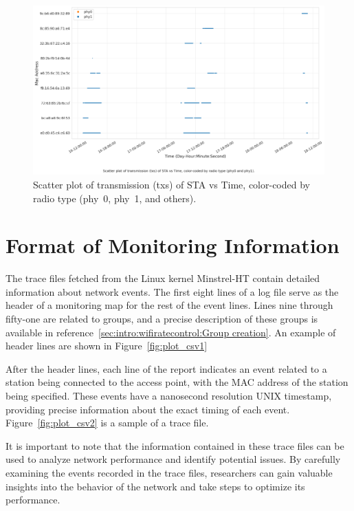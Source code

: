 \begin{landscape}

\begin{figure}[htbp]
  \centering
    \includegraphics[width=\textwidth, height=\textheight, keepaspectratio]{figures/plots/22.png}
  \caption[Stations' Transmission Over Time]{Scatter plot of transmission (txs) of STA vs Time, color-coded by radio type (phy~0, phy~1, and others).}
  \label{fig:plot_22_population}
\end{figure}
\end{landscape}

\section{Format of Monitoring Information}
\label{sec:Measurement Tools:Format of Monitoring Information}

The trace files fetched from the Linux kernel Minstrel-HT contain detailed information about network events. The first eight lines of a log file serve as the header of a monitoring map for the rest of the event lines. Lines nine through fifty-one are related to groups, and a precise description of these groups is available in reference~\ref{sec:intro:wifiratecontrol:Group creation}. An example of header lines are shown in Figure~\ref{fig:plot_csv1}

After the header lines, each line of the report indicates an event related to a station being connected to the access point, with the MAC address of the station being specified. These events have a nanosecond resolution UNIX timestamp, providing precise information about the exact timing of each event. Figure~\ref{fig:plot_csv2} is a sample of a trace file.

It is important to note that the information contained in these trace files can be used to analyze network performance and identify potential issues. By carefully examining the events recorded in the trace files, researchers can gain valuable insights into the behavior of the network and take steps to optimize its performance.


